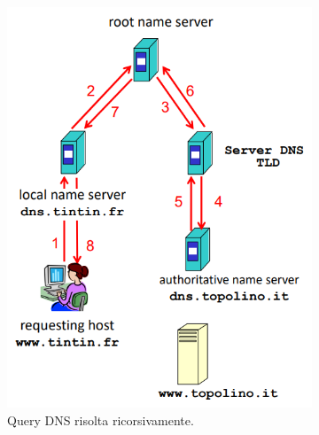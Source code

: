 \documentclass[11pt, italian, openany]{book}
\begin{document}
\begin{sloppypar}
\begin{itemize}[topsep=0pt]
	\begin{figure}[!h]
		\begin{subfigure}{0.49 \linewidth} \centering
			\includegraphics[scale=0.35]{images/dns-query-ricorsiva.png}
			\caption{Query DNS risolta ricorsivamente.}
		\end{subfigure}
		\begin{subfigure}{0.49 \linewidth} \centering

\end{subfigure}
\end{figure}
\end{itemize}
\end{sloppypar}
\end{document}
